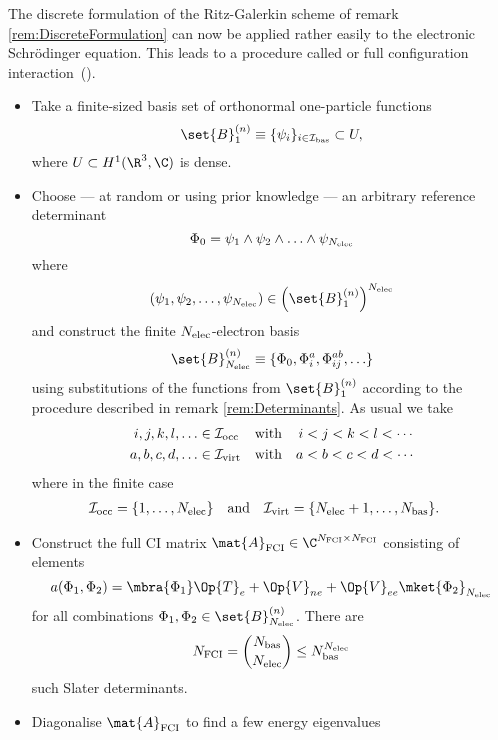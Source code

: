 \newcommand{\Nfci}{N_\text{FCI}}
\begin{rem}[Full CI]
	\label{rem:FCI}
	The discrete formulation of the Ritz-Galerkin scheme
	of remark \vref{rem:DiscreteFormulation}
	can now be applied rather easily to the electronic Schrödinger equation.
	This leads to a procedure called 
	or full configuration interaction~(\FCI).

	\begin{itemize}
	\item Take a finite-sized basis set of orthonormal one-particle functions
	\[ \set{B}_1^{(n)} \equiv \{\psi_i\}_{i \in \Ibas} \subset U, \]
	where $U \subset H^1(\R^3, \C)$ is dense.
	\item Choose --- at random or using prior knowledge ---
		an arbitrary reference determinant
	\[ \Phi_0 = \psi_1 \wedge \psi_2 \wedge \ldots \wedge \psi_{N_\text{elec}} \]
	where
	\[ (\psi_1, \psi_2, \ldots, \psi_{\Nelec}) \in \left(\set{B}_1^{(n)}\right)^{\Nelec} \]
	and construct the finite $N_\text{elec}$-electron basis
	\begin{equation}
		\set{B}_{\Nelec}^{(n)} \equiv \{ \Phi_0, \Phi_i^a, \Phi_{ij}^{ab}, \ldots \}
		\label{eqn:NelectronBasisFinite}
	\end{equation}
	using substitutions of the functions from $\set{B}_1^{(n)}$
	according to the procedure described in remark \vref{rem:Determinants}.
	As usual we take
	\begin{align}
		\label{eqn:CondOccIndex}
		i, j, k, l, \ldots &\in \mathcal{I}_\text{occ} &&\text{with}& i&<j<k<l<\cdots \\
		\label{eqn:CondVirtIndex}
		a, b, c, d, \ldots &\in \mathcal{I}_\text{virt} &&\text{with}& a&<b<c<d<\cdots
	\end{align}
	where in the finite case
	\begin{align*}
		\mathcal{I}_\text{occ} &= \{1, \ldots, N_\text{elec}\} &&\text{and}& \mathcal{I}_\text{virt} &= \{ N_\text{elec} + 1, \ldots, N_\text{bas} \}.
	\end{align*}
	\item Construct the full CI matrix $\mat{A}_\text{FCI} \in \C^{\Nfci \times \Nfci}$
		consisting of elements
		\begin{equation}
			a(\Phi_1, \Phi_2)
			= \mbra{\Phi_1}
			\Op{T}_e + \Op{V}_{ne} + \Op{V}_{ee}
			\mket{\Phi_2}_{\Nelec}
			\label{eqn:FCIMatrixElements}
		\end{equation}
		for all combinations $\Phi_1, \Phi_2 \in \set{B}_{\Nelec}^{(n)}$.
		There are
		\[ \Nfci = \binom{\Nbas}{\Nelec} \leq \Nbas^{\Nelec} \]
		such Slater determinants.
	\item Diagonalise $\mat{A}_\text{FCI}$ to find a few energy eigenvalues

\end{itemize}
\end{rem}
